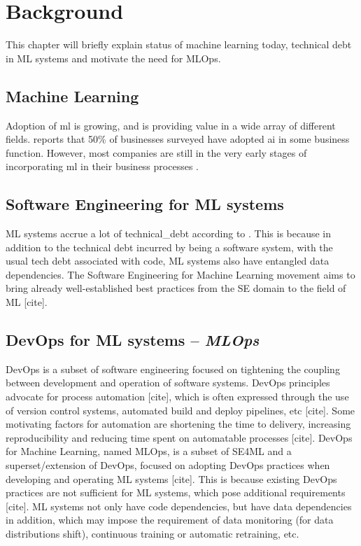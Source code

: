\chapter{Background}
\label{ch:background}
This chapter will briefly explain status of machine learning today, technical debt in ML systems and motivate the need for MLOps.

\section{Machine Learning}
Adoption of \acrshort{ml} is growing, and is providing value in a wide array of different fields.
\textcite{mckinsey2020} reports that 50\% of businesses surveyed have adopted \acrshort{ai} in some business function.
However, most companies are still in the very early stages of incorporating \acrshort{ml} in their business processes \cite{Schloegl2019}.

\section{Software Engineering for ML systems}
ML systems accrue a lot of \gls{technical_debt} according to \textcite{Sculley2015}.
This is because in addition to the technical debt incurred by being a software system, with the usual tech debt associated with code, ML systems also have entangled data dependencies.
The Software Engineering for Machine Learning movement aims to bring already well-established best practices from the SE domain to the field of ML [cite].

\section{DevOps for ML systems -- \emph{MLOps}}
DevOps is a subset of software engineering focused on tightening the coupling between development and operation of software systems.
DevOps principles advocate for process automation [cite], which is often expressed through the use of version control systems, automated build and deploy pipelines, etc [cite].
Some motivating factors for automation are shortening the time to delivery, increasing reproducibility and reducing time spent on automatable processes [cite].
DevOps for Machine Learning, named MLOps, is a subset of SE4ML and a superset/extension of DevOps, focused on adopting DevOps practices when developing and operating ML systems [cite].
This is because existing DevOps practices are not sufficient for ML systems, which pose additional requirements [cite].
ML systems not only have code dependencies, but have data dependencies in addition, which may impose the requirement of data monitoring (for data distributions shift), continuous training or automatic retraining, etc.

